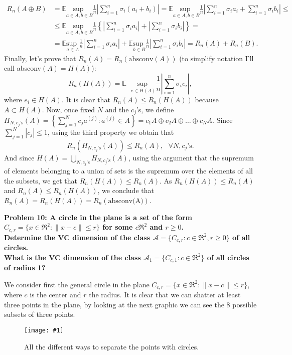 \documentclass[11pt, english]{article}
\newcommand{\grafico}[5]{
	\begin{figure}
		[h!tbp]
		\centering
		\texttt{[image: \#1]}
		\caption{#4\label{#5}}
	\end{figure}
}
\newcommand{\su}[2]{\sum\limits_{#1}^{#2}}
\begin{document}
\begin{align}
	R_n(A\oplus B)&=\mathbb{E}\underset{a\in A,b\in B}{\text{sup }}\frac{1}{n}\left|\su{i=1}{n}\sigma_i (a_i+b_i)\right|=\mathbb{E}\underset{a\in A,b\in B}{\text{sup }}\frac{1}{n}\left|\su{i=1}{n}\sigma_i a_i+\su{i=1}{n}\sigma_i b_i\right|\leq\\
	&\leq \mathbb{E}\underset{a\in A,b\in B}{\text{sup }}\frac{1}{n}\left\{\left|\su{i=1}{n}\sigma_i a_i\right|+\left|\su{i=1}{n}\sigma_i b_i\right|\right\}=\\
	&=\mathbb{E}\underset{a\in A}{\text{sup }}\frac{1}{n}\left|\su{i=1}{n}\sigma_i a_i\right|+\mathbb{E}\underset{b\in B}{\text{sup }}\frac{1}{n}\left|\su{i=1}{n}\sigma_i b_i\right|=R_n(A)+R_n(B).
\end{align} 
Finally, let's prove that $R_n(A)=R_n(\text{absconv}(A))$ (to simplify notation I'll call absconv$(A)=H(A)$):
\begin{equation}
	R_n(H(A))=\mathbb{E}\text{ }\underset{e\in H(A)}{\text{sup }}\frac{1}{n}\left|\su{i=1}{n}\sigma_i e_i\right|,
\end{equation}
where $e_i\in H(A)$. It is clear that $R_n(A)\leq R_n(H(A))$ because $A\subset H(A)$. Now, once fixed $N$ and the $c_j$'s, we define $H_{N,c_j\text{'s}}(A)=\left\{\su{j=1}{N}c_ja^{(j)}:a^{(j)}\in A\right\}=c_1 A\oplus c_2 A\oplus\dots\oplus c_N A$. Since $\su{j=1}{N}|c_j|\leq 1$, using the third property we obtain that \begin{equation}
	R_n(H_{N,c_j\text{'s}}(A))\leq R_n(A), \text{ }\forall N,c_j\text{'s}.
\end{equation}
And since $H(A)=\bigcup\limits_{N,c_j\text{'s}}H_{N,c_j\text{'s}}(A)$, using the argument that the supremum of elements belonging to a union of sets is the supremum over the elements of all the subsets, we get that $R_n(H(A))\leq R_n(A)$. As $R_n(H(A))\leq R_n(A)$ and $R_n(A)\leq R_n(H(A))$, we conclude that $R_n(A)=R_n(H(A))=R_n(\text{absconv(A)})$.
\newpage

\textbf{Problem 10: A circle in the plane is a set of the form $C_{c,r}=\{x\in\Re^2:\|x-c\|\leq r\}$ for some $c\Re^2$ and $r\geq 0$.\\
Determine the VC dimension of the class $\mathcal{A}=\{C_{c,r}:c\in\Re^2,r\geq 0 \}$ of all circles.\\
What is the VC dimension of the class $\mathcal{A_1}=\{C_{c,1}:c\in\Re^2\}$ of all circles of radius 1?\\}

We consider first the general circle in the plane $C_{c,r}=\{x\in\Re^2:\|x-c\|\leq r\}$, where $c$ is the center and $r$ the radius. It is clear that we can shatter at least three points in the plane, by looking at the next graphic we can see the 8 possible subsets of three points.
\grafico{graphics/shatters.jpeg}{0.4}{0}{All the different ways to separate the points with circles.}{shatter}
\end{document}
